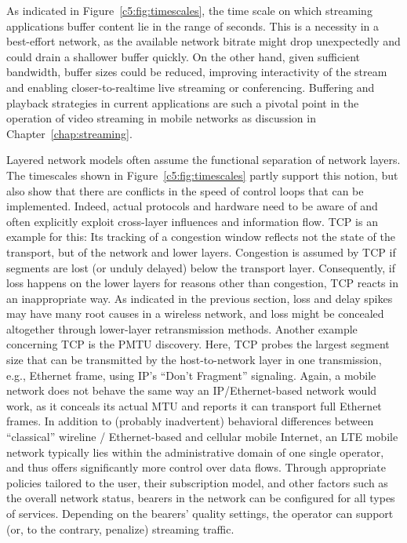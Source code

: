 As indicated in Figure~\ref{c5:fig:timescales}, the time scale on which streaming applications buffer content lie in the range of seconds. This is a necessity in a best-effort network, as the available network bitrate might drop unexpectedly and could drain a shallower buffer quickly. On the other hand, given sufficient bandwidth, buffer sizes could be reduced, improving interactivity of the stream and enabling closer-to-realtime live streaming or conferencing.
Buffering and playback strategies in current applications are such a pivotal point in the operation of video streaming in mobile networks as discussion in Chapter~\ref{chap:streaming}.

Layered network models often assume the functional separation of network layers. The timescales shown in Figure~\ref{c5:fig:timescales} partly support this notion, but also show that there are conflicts in the speed of control loops that can be implemented. Indeed, actual protocols and hardware need to be aware of and often explicitly exploit cross-layer influences and information flow.
\gls{TCP} is an example for this: Its tracking of a congestion window reflects not the state of the transport, but of the network and lower layers. Congestion is assumed by \gls{TCP} if segments are lost (or unduly delayed) below the transport layer. Consequently, if loss happens on the lower layers for reasons other than congestion, \gls{TCP} reacts in an inappropriate way. As indicated in the previous section, loss and delay spikes may have many root causes in a wireless network, and loss might be concealed altogether through lower-layer retransmission methods.
Another example concerning \gls{TCP} is the \gls{PMTU} discovery. Here, \gls{TCP} probes the largest segment size that can be transmitted by the host-to-network layer in one transmission, e.g., Ethernet frame, using \gls{IP}'s ``Don't Fragment'' signaling. Again, a mobile network does not behave the same way an \gls{IP}/Ethernet-based network would work, as it conceals its actual \gls{MTU} and reports it can transport full Ethernet frames.
In addition to (probably inadvertent) behavioral differences between ``classical'' wireline / Ethernet-based and cellular mobile Internet, an \gls{LTE} mobile network typically lies within the administrative domain of one single operator, and thus offers significantly more control over data flows. Through appropriate policies tailored to the user, their subscription model, and other factors such as the overall network status, bearers in the network can be configured for all types of services. Depending on the bearers' quality settings, the operator can support (or, to the contrary, penalize) streaming traffic.


